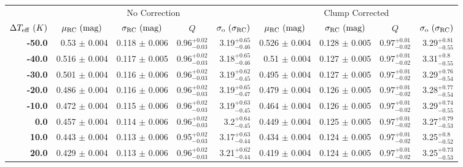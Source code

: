 \documentclass[fleqn,usenatbib]{mnras}
\begin{document}
\begin{table}
    \begin{tabular}{rrrrr|rrrr}
    \toprule
    {} & \multicolumn{4}{|c|}{No Correction} & \multicolumn{4}{|c|}{Clump Corrected} \\
    \cmidrule(lr){2-5}\cmidrule(lr){6-9}
    \multicolumn{1}{c}{$\Delta T_{\rm eff}\ (K)$} & \multicolumn{1}{c}{$\mu_{\rm RC}\ (\rm mag)$} & \multicolumn{1}{c}{$\sigma_{\rm RC}\ (\rm mag)$}  & \multicolumn{1}{c}{$Q$} &  \multicolumn{1}{c}{$\sigma_{\rm o}\ (\sigma_{\rm RC})$} & \multicolumn{1}{c}{$\mu_{\rm RC}\ (\rm mag)$} & \multicolumn{1}{c}{$\sigma_{\rm RC}\ (\rm mag)$}  & \multicolumn{1}{c}{$Q$} &  \multicolumn{1}{c}{$\sigma_{\rm o}\ (\sigma_{\rm RC})$} \\
    \midrule
        \textbf{-50.0} &   0.53 $\pm$ 0.004 &  0.118 $\pm$ 0.006 &  0.96$_{-0.03}^{+0.02}$ &  3.19$_{-0.46}^{+0.65}$    &  0.526 $\pm$ 0.004 &   0.128 $\pm$ 0.005 &  0.97$_{-0.02}^{+0.01}$ &   3.29$_{-0.55}^{+0.81}$ \\
        \textbf{-40.0} &  0.516 $\pm$ 0.004 &  0.117 $\pm$ 0.005 &  0.96$_{-0.03}^{+0.02}$ &  3.18$_{-0.46}^{+0.65}$    &   0.51 $\pm$ 0.004 &   0.127 $\pm$ 0.005 &  0.97$_{-0.02}^{+0.01}$ &   3.31$_{-0.55}^{+ 0.8}$ \\
        \textbf{-30.0} &  0.501 $\pm$ 0.004 &  0.116 $\pm$ 0.006 &  0.96$_{-0.03}^{+0.02}$ &  3.19$_{-0.45}^{+0.62}$    &  0.495 $\pm$ 0.004 &   0.127 $\pm$ 0.005 &  0.97$_{-0.02}^{+0.01}$ &   3.29$_{-0.54}^{+0.76}$ \\
        \textbf{-20.0} &  0.486 $\pm$ 0.004 &  0.116 $\pm$ 0.006 &  0.96$_{-0.03}^{+0.02}$ &  3.19$_{-0.47}^{+0.65}$    &  0.479 $\pm$ 0.004 &   0.126 $\pm$ 0.005 &  0.97$_{-0.02}^{+0.01}$ &   3.28$_{-0.54}^{+0.77}$ \\
        \textbf{-10.0} &  0.472 $\pm$ 0.004 &  0.115 $\pm$ 0.006 &  0.96$_{-0.03}^{+0.02}$ &  3.19$_{-0.45}^{+0.63}$    &  0.464 $\pm$ 0.004 &   0.126 $\pm$ 0.005 &  0.97$_{-0.02}^{+0.01}$ &   3.29$_{-0.55}^{+0.74}$ \\
        \textbf{0.0  } &  0.457 $\pm$ 0.004 &  0.114 $\pm$ 0.006 &  0.96$_{-0.03}^{+0.02}$ &   3.2$_{-0.45}^{+0.64}$    &  0.449 $\pm$ 0.004 &   0.125 $\pm$ 0.005 &  0.97$_{-0.02}^{+0.01}$ &   3.27$_{-0.53}^{+0.79}$ \\
        \textbf{10.0 } &  0.443 $\pm$ 0.004 &  0.113 $\pm$ 0.006 &  0.95$_{-0.03}^{+0.02}$ &  3.17$_{-0.44}^{+0.63}$    &  0.434 $\pm$ 0.004 &   0.124 $\pm$ 0.005 &  0.97$_{-0.02}^{+0.01}$ &   3.25$_{-0.52}^{+ 0.8}$ \\
        \textbf{20.0 } &  0.429 $\pm$ 0.004 &  0.113 $\pm$ 0.006 &  0.96$_{-0.03}^{+0.02}$ &  3.21$_{-0.44}^{+0.62}$    &  0.419 $\pm$ 0.004 &   0.124 $\pm$ 0.005 &  0.97$_{-0.02}^{+0.01}$ &   3.25$_{-0.53}^{+0.73}$ \\

\end{tabular}
\end{table}
\end{document}
